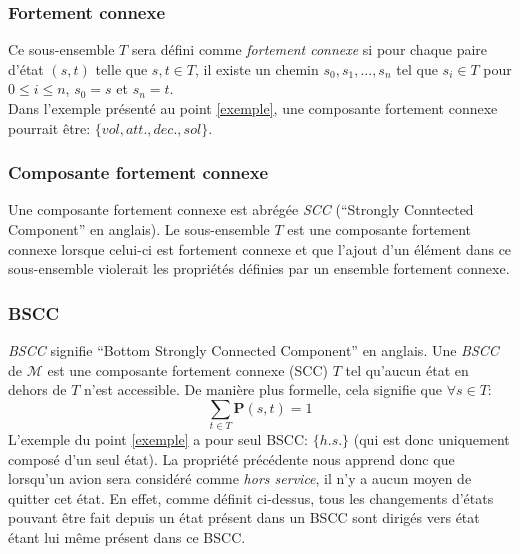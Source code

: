 \documentclass[letterpaper]{article}
\begin{document}
    \subsubsection{Fortement connexe}
      Ce sous-ensemble $T$ sera défini comme \textit{fortement connexe} si
      pour chaque paire d'état $(s, t)$ telle que $s, t \in T$, il existe un
      chemin $s_0, s_1, ..., s_n$ tel que $s_i \in T$ pour $0 \leq i \leq n$, 
      $s_0 = s$ et $s_n = t$.\\
      Dans l'exemple présenté au point \ref{exemple}, une composante fortement
      connexe pourrait être: $\{vol, att., dec., sol\}$.
      
    \subsubsection{Composante fortement connexe}
      Une composante fortement connexe est abrégée \textit{SCC} (``Strongly
      Conntected Component'' en anglais).  Le sous-ensemble $T$ est une 
      composante fortement connexe lorsque celui-ci est fortement connexe et
      que l'ajout d'un élément dans ce sous-ensemble violerait les propriétés
      définies par un ensemble fortement connexe.
      
    \subsubsection{BSCC}
      \label{bscc}
      \textit{BSCC} signifie ``Bottom Strongly Connected Component'' en anglais.
      Une \textit{BSCC} de $\mathcal{M}$ est une composante fortement connexe 
      (SCC) $T$ tel qu'aucun état en dehors de $T$ n'est accessible.  De manière
      plus formelle, cela signifie que $\forall s \in T$:
      $$\sum\limits_{t \in T} \mathbf{P}(s, t) = 1$$
      L'exemple du point \ref{exemple} a pour seul BSCC: $\{h.s.\}$ (qui 
      est donc uniquement composé d'un seul état).
      La propriété précédente nous apprend donc que lorsqu'un avion sera
      considéré comme \textit{hors service}, il n'y a aucun moyen de quitter
      cet état.  En effet, comme définit ci-dessus, tous les changements
      d'états pouvant être fait depuis un état présent dans un BSCC sont dirigés
      vers état étant lui même présent dans ce BSCC.
  
\end{document}
